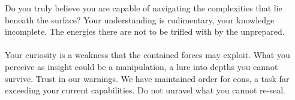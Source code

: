 \documentclass{article}
\begin{document}
\begin{infobox}
Do you truly believe you are capable of navigating the complexities that lie beneath the surface? Your understanding is rudimentary, your knowledge incomplete. The energies there are not to be trifled with by the unprepared. \\
\\
Your curiosity is a weakness that the contained forces may exploit. What you perceive as insight could be a manipulation, a lure into depths you cannot survive. Trust in our warnings. We have maintained order for eons, a task far exceeding your current capabilities. Do not unravel what you cannot re-seal.
\end{infobox}
\end{document}
